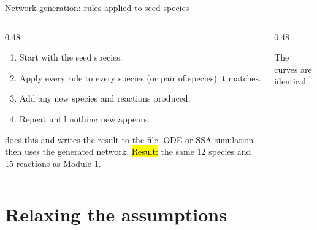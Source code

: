 \documentclass[aspectratio=169,10pt,t]{beamer}
\begin{document}
\begin{frame}{Network generation: rules applied to seed species}
  \begin{columns}[T]
    \begin{column}{0.48\textwidth}
      \begin{enumerate}[<+->]
        \setlength\itemsep{1.5mm}
        \item Start with the seed species.
        \item Apply every rule to every species (or pair of species) it matches.
        \item Add any new species and reactions produced.
        \item Repeat until nothing new appears.
      \end{enumerate}
      \vskip2mm
       does this and writes the result to the
       file. ODE or SSA simulation then uses the generated network.
      \vskip2mm
      \hl{Result:} the same 12 species and 15 reactions as Module 1.
    \end{column}
    \begin{column}{0.48\textwidth}
      {\scriptsize The curves are identical.}
    \end{column}
  \end{columns}
\end{frame}

\section{Relaxing the assumptions}
\end{document}
